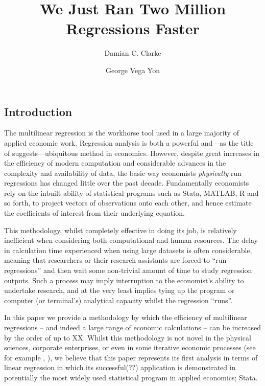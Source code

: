 \documentclass{article}[11pt,subeqn]
\title{We Just Ran Two Million Regressions Faster}
\author{Damian C. Clarke \and George Vega Yon}
\begin{document}
\begin{spacing}{1.25}

\maketitle

\begin{abstract}

\end{abstract}

\section{Introduction}
The multilinear regression is the workhorse tool used in a large majority of applied economic work.  Regression analysis is both a powerful and---as the 
title of \citet{SalaiMartin1997} suggests---ubiquitous method in economics.  However, despite great increases in the efficiency of modern computation and
considerable advances in the complexity and availability of data, the basic way economists \emph{physically} run regressions has changed little over
the past decade.  Fundamentally economists rely on the inbuilt ability of statistical programs such as Stata, MATLAB, R and so forth, to project vectors
of observations onto each other, and hence estimate the coefficients of interest from their underlying equation.

This methodology, whilst completely effective in doing its job, is relatively inefficient when considering both computational and human resources.  The
delay in calculation time experienced when using large datasets is often considerable, meaning that researchers or their research assistants are forced
to ``run regressions'' and then wait some non-trivial amount of time to study regression outputs.  Such a process may imply interruption to the economist's ability 
to undertake research, and at the very least implies tying up the program or computer (or terminal's) analytical capacity whilst the regression ``runs''.  

In this paper we provide a methodology by which the efficiency of multilinear regressions -- and indeed a large range of economic calculations -- can be
increased by the order of up to XX.  Whilst this methodology is not novel in the physical sciences, corporate enterprises, or even in some iterative economic
processes (see for example \citeauthor{aldrich2011}, \citeyear{aldrich2011}), we believe that this paper represents its first analysis in terms of linear 
regression in which its successful(??) application is demonstrated in potentially the most widely used statistical program in applied economics; Stata.  


\end{spacing}
\end{document}
